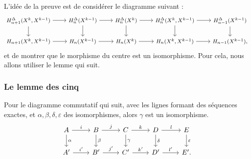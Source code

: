 L'idée de la preuve est de considérer le diagramme suivant : \[\footnotesize\begin{tikzcd}
H_{n+1}^\Delta(X^k,X^{k-1})\arrow[d]\arrow[r]&H_{n}^\Delta(X^{k-1})\arrow[d]\arrow[r]&H_{n}^\Delta(X^{k})\arrow[d]\arrow[r]&H_{n}^\Delta(X^k,X^{k-1})\arrow[d]\arrow[r]&H_{n-1}^\Delta(X^{k-1})\arrow[d]\\
H_{n+1}(X^k,X^{k-1})\arrow[r]&H_{n}(X^{k-1})\arrow[r]&H_{n}(X^{k})\arrow[r]&H_{n}(X^k,X^{k-1})\arrow[r]&H_{n-1}(X^{k-1}),
\end{tikzcd}\]et de montrer que le morphisme du centre est un isomorphisme. Pour cela, nous allons utiliser le lemme qui suit.

\subsubsection{Le lemme des cinq}
\begin{lemma}
Pour le diagramme commutatif qui suit, avec les lignes formant des séquences exactes, et $\alpha,\beta,\delta,\varepsilon$ des isomorphismes, alors $\gamma$ est un isomorphisme.
\[\begin{tikzcd}
A\arrow[d, "\alpha"]\arrow[r, "i"]&B\arrow[d, "\beta"]\arrow[r, "j"]&C\arrow[d, "\gamma"]\arrow[r, "k"]&D\arrow[d,"\delta"]\arrow[r, "l"]&E\arrow[d,"\varepsilon"]\\
A'\arrow[r, "i'"]&B'\arrow[r, "j'"]&C'\arrow[r, "k'"]&D'\arrow[r, "l'"]&E'.
\end{tikzcd}\]
\end{lemma}
